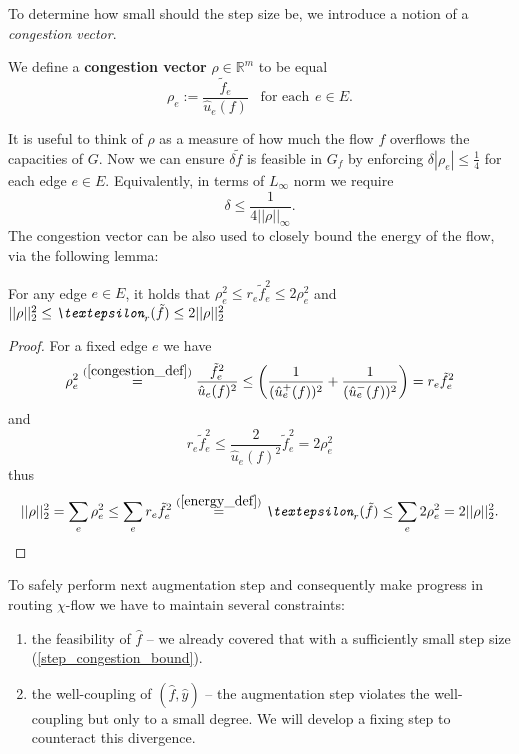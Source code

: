 To determine how small should the step size be, we introduce a notion of a \textit{congestion vector}.
\begin{definition}
We define a \textbf{congestion vector} $\rho\in\mathbb{R}^m$ to be equal
\begin{equation} \label{congestion_def}
\rho_e := \frac{\tilde  f_e}{\hat u_e(f)} \hspace{10pt}\text{for each}\hspace{5pt}e\in E.
\end{equation}
\end{definition}
It is useful to think of $\rho$ as a measure of how much the flow $f$ overflows the capacities of $G$.
Now we can ensure $\delta\tilde  f$ is feasible in $G_f$ by enforcing $\delta|\rho_e| \le \frac{1}{4}$ for each edge $e\in E$. Equivalently, in terms of $L_\infty$ norm we require
\begin{equation} \label{step_congestion_bound}
\delta \le \frac{1}{4||\rho||_\infty}.
\end{equation}
The congestion vector can be also used to closely bound the energy of the flow, via the following lemma:
\begin{lemma} \label{congestion_energy_bound}
For any edge $e\in E$, it holds that $\rho_e^2\le r_e \tilde f_e^2 \le 2\rho_e^2$ and
$ ||\rho||_2^2\le\emph{\textepsilon}_r(\tilde  f)\le2||\rho||_2^2 $
\end{lemma}
\begin{proof}
For a fixed edge $e$ we have
\[
\rho_e^2
\stackrel{(\ref{congestion_def})}{=} \frac{\tilde  f_e^2}{\hat u_e(f)^2}
\le \left(\frac{1}{(\hat u_e^+(f))^2}+\frac{1}{(\hat u_e^-(f))^2}\right)
= r_e\tilde f_e^2
\]
and
\[
r_e\tilde  f_e^2
\le \frac{2}{\hat u_e(f)^2}\tilde  f_e^2
= 2\rho^2_e
\]
thus
\[
||\rho||_2^2
= \sum_e \rho_e^2
\le \sum_e r_e\tilde  f_e^2
\stackrel{(\ref{energy_def})}{=} \emph{\textepsilon}_r(\tilde  f)
\le \sum_e 2\rho_e^2
= 2||\rho||_2^2.
\]
\end{proof}

To safely perform next augmentation step and consequently make progress in routing $\chi$-flow we have to maintain several constraints:
\begin{enumerate}
    \item the feasibility of $\hat f$ -- we already covered that with a sufficiently small step size (\ref{step_congestion_bound}).
    \item the well-coupling of $(\hat f,\hat y)$ -- the augmentation step violates the well-coupling but only to a small degree. We will develop a fixing step to counteract this divergence. 
\end{enumerate}


